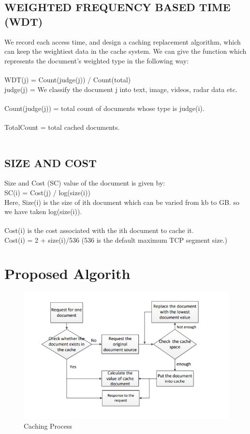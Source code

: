\documentclass[conference]{IEEEtran}
\begin{document}
\subsection{WEIGHTED FREQUENCY BASED TIME (WDT) }
We record each access time, and design a caching replacement algorithm, which can keep the weightiest data in the cache system. We can give the function which represents
the document’s weighted type in the following way:\\ \\
WDT(j) = Count(judge(j)) / Count(total) \\ 

judge(j) = We classify the document j into text, image, videos, radar data etc. \\ \\ 
Count(judge(j)) = total count of documents whose type is  judge(i).\\ \\
TotalCount = total cached documents.\\ \\

\subsection{SIZE AND COST }

Size and Cost (SC) value of the document is given by: \\
	              SC(i) = Cost(j) / log(size(i)) \\

Here, Size(i) is the size of ith document which can be varied from kb to GB.  so we have taken log(size(i)). \\
\\
Cost(i) is the cost associated with the ith document to cache it.
		\\ Cost(i) = 2 + size(i)/536  (536 is the default maximum TCP segment size.) \\

\section{Proposed Algorith}

\begin{figure}[htbp]
\centerline{\includegraphics[width = 0.7\linewidth]{flow_chart.png}}
\caption{Caching Process}
\label{fig}
\end{figure}
\end{document}
